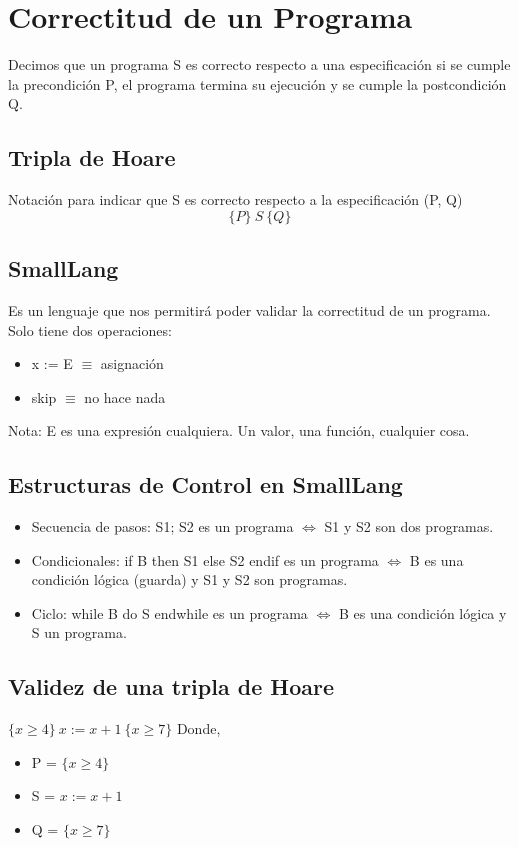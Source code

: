 \documentclass[10pt,a4paper]{article}
\begin{document}
\section*{Correctitud de un Programa}
Decimos que un programa S es correcto respecto a una especificación si se cumple la precondición P, el programa termina su ejecución y se cumple la postcondición Q.
\subsection*{Tripla de Hoare}
Notación para indicar que S es correcto respecto a la especificación (P, Q) \\ 
\[\{P\} \ S \ \{Q\}\]

\subsection*{SmallLang}
Es un lenguaje que nos permitirá poder validar la correctitud de un programa.
Solo tiene dos operaciones: 
\begin{itemize}
    \item x := E \(\equiv\) asignación
    \item skip \(\equiv\) no hace nada
\end{itemize}

Nota: E es una expresión cualquiera. Un valor, una función, cualquier cosa.

\subsection*{Estructuras de Control en SmallLang}
\begin{itemize}
    \item Secuencia de pasos: S1; S2 es un programa \(\iff\) S1 y S2 son dos programas.
    \item Condicionales: if B then S1 else S2 endif es un programa \(\iff\) B es una condición lógica (guarda) y S1 y S2 son programas.
    \item Ciclo: while B do S endwhile es un programa \(\iff\) B es una condición lógica y S un programa.
\end{itemize}

\subsection*{Validez de una tripla de Hoare}
\(\{x \ge 4\} \ x := x+1 \ \{x \ge 7\}\)
Donde, 
\begin{itemize}
    \item P = \(\{x \ge 4\}\)
    \item S = \(x := x+1\)
    \item Q = \(\{x \ge 7\}\)
\end{itemize}
\end{document}
